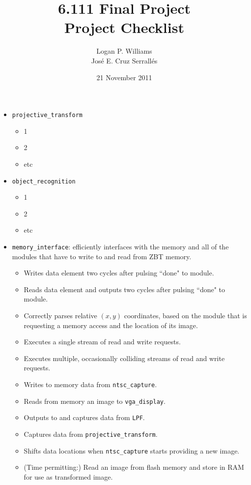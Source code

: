 \documentclass{article}
\title{6.111 Final Project\\Project Checklist}
\date{21 November 2011}
\author{Logan P. Williams\\Jos\'{e} E. Cruz Serrall\'{e}s}
\begin{document}
\maketitle

\begin{itemize}
\item[] {\tt projective\_transform}
	\begin{itemize}
	\item 1
	\item 2
	\item etc
	\end{itemize}

\item[] {\tt object\_recognition}
	\begin{itemize}
	\item 1
	\item 2
	\item etc
	\end{itemize}

\item[] {\tt memory\_interface}: efficiently interfaces with the memory and all of the modules that have to write to and read from ZBT memory.
	\begin{itemize}
	\item Writes data element two cycles after pulsing ``done" to module.
	\item Reads data element and outputs two cycles after pulsing ``done" to module.
	\item Correctly parses relative $(x,y)$ coordinates, based on the module that is requesting a memory access and the location of its image.
	\item Executes a single stream of read and write requests.
	\item Executes multiple, occasionally colliding streams of read and write requests.
	\item Writes to memory data from {\tt ntsc\_capture}.
	\item Reads from memory an image to {\tt vga\_display}.
	\item Outputs to and captures data from {\tt LPF}.
	\item Captures data from {\tt projective\_transform}.
	\item Shifts data locations when {\tt ntsc\_capture} starts providing a new image.
	\item (Time permitting:) Read an image from flash memory and store in RAM for use as transformed image.
	\end{itemize}


\end{itemize}
\end{document}
